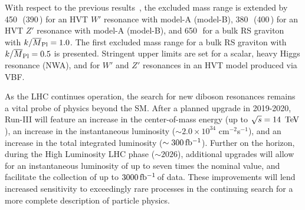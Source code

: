 With respect to the previous results~\cite{diboson_comb_2016,CMS_diboson_run2}, the excluded mass range is extended by 450\,\GeV\, (390\,\GeV) for an HVT $W'$ resonance with model-A (model-B), 380\,\GeV\, (400\,\GeV) for an HVT $Z'$ resonance with model-A (model-B), and 650\,\GeV\, for a bulk RS graviton with $k/\overline{M}_{\rm Pl}=1.0$. The first excluded mass range for a bulk RS graviton with $k/\overline{M}_{\rm Pl}=0.5$ is presented. Stringent upper limits are set for a scalar, heavy Higgs resonance (NWA), and for $W'$ and $Z'$ resonances in an HVT model produced via VBF. 

As the LHC continues operation, the search for new diboson resonances remains a vital probe of physics beyond the SM. After a planned upgrade in 2019-2020, Run-III will feature an increase in the center-of-mass energy (up to $\sqrt{s}=14\,\TeV$), an increase in the instantaneous luminosity ($\sim 2.0\times 10^{34}$ cm$^{-2}$s$^{-1}$), and an increase in the total integrated luminosity ($\sim 300\,\mbox{fb$^{-1}$}$).  Further on the horizon, during the High Luminosity LHC phase ($\sim2026$), additional upgrades will allow for an instantaneous luminosity of up to seven times the nominal value, and facilitate the collection of up to $3000\,\mbox{fb$^{-1}$}\,$of data.
These improvements will lend increased sensitivity to exceedingly rare processes in the continuing search for a more complete description of particle physics. 



